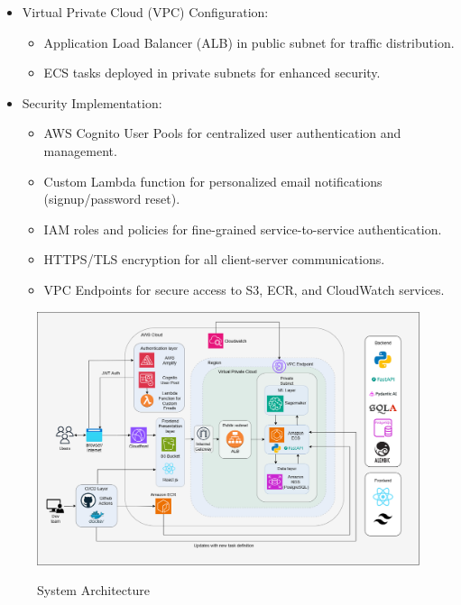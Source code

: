 \documentclass[11pt]{article}
\begin{document}
\begin{itemize}
    \item Virtual Private Cloud (VPC) Configuration:
    \begin{itemize}
        \item Application Load Balancer (ALB) in public subnet for traffic distribution.
        \item ECS tasks deployed in private subnets for enhanced security.
    \end{itemize}

    \item Security Implementation:
    \begin{itemize}
        \item AWS Cognito User Pools for centralized user authentication and management.
        \item Custom Lambda function for personalized email notifications (signup/password reset).
        \item IAM roles and policies for fine-grained service-to-service authentication.
        \item HTTPS/TLS encryption for all client-server communications.
        \item VPC Endpoints for secure access to S3, ECR, and CloudWatch services.
    \end{itemize}
\end{itemize}
\begin{figure}[H]
    \centering
    \href{https://drive.google.com/file/d/1lJucSu2xudmuGDQbB22ojH6RFfhKNEwI/view?usp=sharing}{
        \includegraphics[width=1\linewidth]{Architecture.png}
    }
    \caption{System Architecture}
    \label{fig:System Architecture}
\end{figure}
\end{document}
